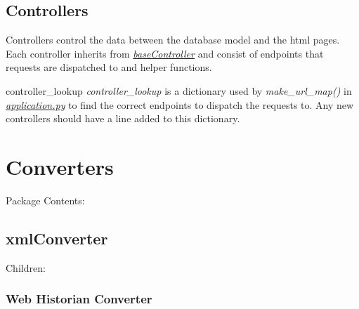 \documentclass[letterpaper,10pt,english]{manual}
\begin{document}
\subsection{Controllers}

Controllers control the data between the database model and the html pages. Each controller
inherits from \hyperlink{--doc-baseController}{\emph{baseController}} and consist of endpoints that requests
are dispatched to and helper functions.

\hypertarget{webscavator.controllers.controller_lookup}{}\begin{datadesc}{controller\_lookup}
\emph{controller\_lookup} is a dictionary used by \emph{make\_url\_map()}  in \hyperlink{--doc-application}{\emph{application.py}} to
find the correct endpoints to dispatch the requests to.
Any new controllers should have a line added to this dictionary.
\end{datadesc}

\resetcurrentobjects
\hypertarget{--doc-converters}{}

\section{Converters}

Package Contents:

\resetcurrentobjects
\hypertarget{--doc-xmlConverter}{}

\subsection{xmlConverter}

Children:

\resetcurrentobjects
\hypertarget{--doc-webhistorian}{}

\subsubsection{Web Historian Converter}
\hypertarget{module-webscavator.converters.webhistorian}{}
\modulesynopsis{}
\end{document}
